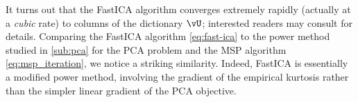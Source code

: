 \documentclass[../../book-main.tex]{subfiles}
\begin{document}
It turns out that the FastICA algorithm converges extremely rapidly (actually at
a \textit{cubic} rate) to columns of the dictionary $\vU$; interested readers
may consult \cite{hyvarinen-1997} for details. 
Comparing the FastICA algorithm \eqref{eq:fast-ica} to the power method studied
in \ref{sub:pca} for the PCA problem and the MSP algorithm
\eqref{eq:msp_iteration}, we notice a striking similarity. Indeed, FastICA is essentially a modified power method, involving the gradient of the empirical kurtosis rather than the simpler linear gradient of the PCA objective.







%
\end{document}
